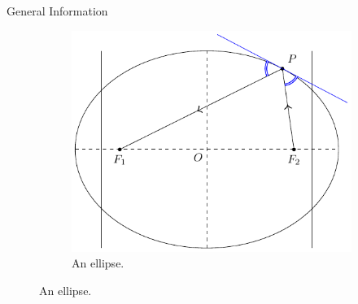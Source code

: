 \begin{stbox}{General Information}{}
\begin{figure}[H]
\begin{subfigure}{0.45\textwidth}
        \includegraphics[width=\textwidth]{../Diagrams/Conics/ellipse.pdf}
        \caption{An ellipse.}
        \label{fig:ellipse2}
    \end{subfigure}


\end{figure}
\end{stbox}
